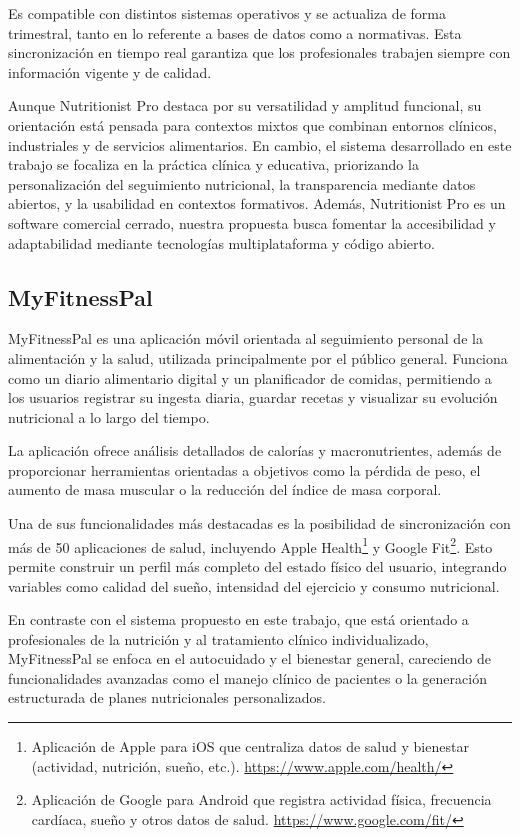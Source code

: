 Es compatible con distintos sistemas operativos y se actualiza de forma trimestral, tanto en lo referente a bases de datos como a normativas. Esta sincronización en tiempo real garantiza que los profesionales trabajen siempre con información vigente y de calidad.

Aunque Nutritionist Pro destaca por su versatilidad y amplitud funcional, su orientación está pensada para contextos mixtos que combinan entornos clínicos, industriales y de servicios alimentarios. En cambio, el sistema desarrollado en este trabajo se focaliza en la práctica clínica y educativa, priorizando la personalización del seguimiento nutricional, la transparencia mediante datos abiertos, y la usabilidad en contextos formativos. Además, Nutritionist Pro es un software comercial cerrado, nuestra propuesta busca fomentar la accesibilidad y adaptabilidad mediante tecnologías multiplataforma y código abierto.

\subsection{MyFitnessPal\cite{Myfitnesspal}}
MyFitnessPal es una aplicación móvil orientada al seguimiento personal de la alimentación y la salud, utilizada principalmente por el público general. Funciona como un diario alimentario digital y un planificador de comidas, permitiendo a los usuarios registrar su ingesta diaria, guardar recetas y visualizar su evolución nutricional a lo largo del tiempo.

La aplicación ofrece análisis detallados de calorías y macronutrientes, además de proporcionar herramientas orientadas a objetivos como la pérdida de peso, el aumento de masa muscular o la reducción del índice de masa corporal. 

Una de sus funcionalidades más destacadas es la posibilidad de sincronización con más de 50 aplicaciones de salud, incluyendo Apple Health\footnote{Aplicación de Apple para iOS que centraliza datos de salud y bienestar (actividad, nutrición, sueño, etc.). \url{https://www.apple.com/health/}} y Google Fit\footnote{Aplicación de Google para Android que registra actividad física, frecuencia cardíaca, sueño y otros datos de salud. \url{https://www.google.com/fit/}}. Esto permite construir un perfil más completo del estado físico del usuario, integrando variables como calidad del sueño, intensidad del ejercicio y consumo nutricional.

En contraste con el sistema propuesto en este trabajo, que está orientado a profesionales de la nutrición y al tratamiento clínico individualizado, MyFitnessPal se enfoca en el autocuidado y el bienestar general, careciendo de funcionalidades avanzadas como el manejo clínico de pacientes o la generación estructurada de planes nutricionales personalizados.

